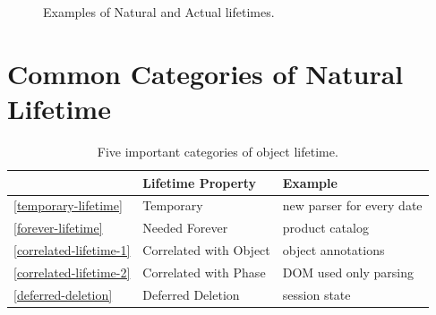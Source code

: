 \begin{figure}
{	}
	\caption{Examples of Natural and Actual lifetimes.}
	\label{fig:typical-lifecycle}
\end{figure}

\section{Common Categories of Natural Lifetime}

\begin{table}
\centering
	\begin{tabular}{lp{}p{}}
	\toprule  & Lifetime Property & Example \\ \midrule
	\autoref{temporary-lifetime}  & {Temporary} & new
	parser for every date
	\\
	\autoref{forever-lifetime} & {Needed Forever} & product catalog
	\\
	\autoref{correlated-lifetime-1} & {Correlated with Object}
	& object annotations
	\\
	\autoref{correlated-lifetime-2} & {Correlated with Phase} &
	DOM used only parsing
	\\
	\autoref{deferred-deletion} & {Deferred Deletion} &
	session state \\
	\bottomrule
	\end{tabular}
	\caption{Five important categories of object lifetime.}
	\label{tab:five-lifetimes}
\end{table}


